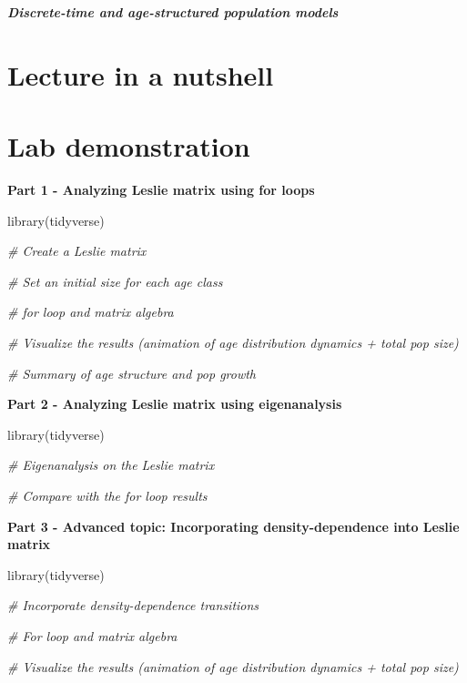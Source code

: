 \documentclass[
]{book}
\newenvironment{Shaded}{\begin{snugshade}}{\end{snugshade}}
\newcommand{\CommentTok}[1]{\textcolor[rgb]{0.56,0.35,0.01}{\textit{#1}}}
\newcommand{\FunctionTok}[1]{\textcolor[rgb]{0.00,0.00,0.00}{#1}}
\newcommand{\NormalTok}[1]{#1}
\begin{document}
\textbf{\emph{Discrete-time and age-structured population models}}

\hypertarget{lecture-in-a-nutshell-3}{%
\section*{Lecture in a nutshell}\label{lecture-in-a-nutshell-3}}

\hypertarget{lab-demonstration-3}{%
\section*{Lab demonstration}\label{lab-demonstration-3}}

\textbf{Part 1 - Analyzing Leslie matrix using for loops}

\begin{Shaded}
\begin{Highlighting}[]
\FunctionTok{library}\NormalTok{(tidyverse)}

\CommentTok{\# Create a Leslie matrix}

\CommentTok{\# Set an initial size for each age class}

\CommentTok{\# for loop and matrix algebra}

\CommentTok{\# Visualize the results (animation of age distribution dynamics + total pop size)}

\CommentTok{\# Summary of age structure and pop growth}
\end{Highlighting}
\end{Shaded}

\textbf{Part 2 - Analyzing Leslie matrix using eigenanalysis}

\begin{Shaded}
\begin{Highlighting}[]
\FunctionTok{library}\NormalTok{(tidyverse)}

\CommentTok{\# Eigenanalysis on the Leslie matrix}

\CommentTok{\# Compare with the for loop results}
\end{Highlighting}
\end{Shaded}

\textbf{Part 3 - Advanced topic: Incorporating density-dependence into Leslie matrix }

\begin{Shaded}
\begin{Highlighting}[]
\FunctionTok{library}\NormalTok{(tidyverse)}

\CommentTok{\# Incorporate density{-}dependence transitions}

\CommentTok{\# For loop and matrix algebra}

\CommentTok{\# Visualize the results (animation of age distribution dynamics + total pop size)}
\end{Highlighting}
\end{Shaded}
\end{document}
